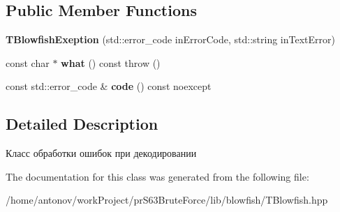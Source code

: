 \subsection*{Public Member Functions}
\begin{DoxyCompactItemize}
\item 
\mbox{\label{classblowfish_lib_1_1blowfish_exeption_1_1_t_blowfish_exeption_abf34d81a97e5611cbde29e4f9d392c19}} 
{\bfseries T\+Blowfish\+Exeption} (std\+::error\+\_\+code in\+Error\+Code, std\+::string in\+Text\+Error)
\item 
\mbox{\label{classblowfish_lib_1_1blowfish_exeption_1_1_t_blowfish_exeption_a9f760be4de799f9010c1552361df8dd3}} 
const char $\ast$ {\bfseries what} () const  throw ()
\item 
\mbox{\label{classblowfish_lib_1_1blowfish_exeption_1_1_t_blowfish_exeption_a95b80b0c4eba5a8951022e70849cd116}} 
const std\+::error\+\_\+code \& {\bfseries code} () const noexcept
\end{DoxyCompactItemize}


\subsection{Detailed Description}
Класс обработки ошибок при декодировании 

The documentation for this class was generated from the following file\+:\begin{DoxyCompactItemize}
\item 
/home/antonov/work\+Project/pr\+S63\+Brute\+Force/lib/blowfish/T\+Blowfish.\+hpp\end{DoxyCompactItemize}
